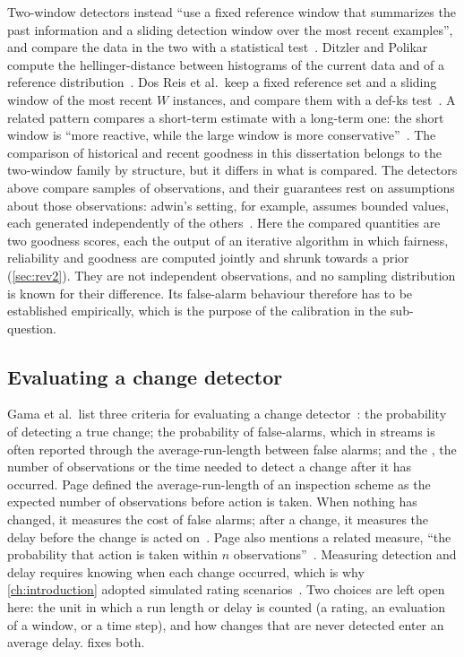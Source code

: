Two-window detectors instead \enquote{use a fixed reference window that summarizes the past information and a sliding detection window over the most recent examples}, and compare the data in the two with a statistical test~\cite[p.~44:17]{Gama2014}. Ditzler and Polikar compute the \gls{hellinger-distance} between histograms of the current data and of a reference distribution~\cite[pp.~42--43]{Ditzler2011}. Dos Reis et al.\ keep a fixed reference set and a sliding window of the most recent $W$ instances, and compare them with a \gls{def-ks} test~\cite[p.~1548]{dosReis2016}. A related pattern compares a short-term estimate with a long-term one: the short window is \enquote{more reactive, while the large window is more conservative}~\cite[p.~44:25]{Gama2014}. The comparison of historical and recent goodness in this dissertation belongs to the two-window family by structure, but it differs in what is compared. The detectors above compare samples of observations, and their guarantees rest on assumptions about those observations: \gls{adwin}'s setting, for example, assumes bounded values, each generated independently of the others~\cite[p.~444]{Bifet2007}. Here the compared quantities are two goodness scores, each the output of an iterative algorithm in which fairness, reliability and goodness are computed jointly and shrunk towards a prior (\cref{sec:rev2}). They are not independent observations, and no sampling distribution is known for their difference. Its false-alarm behaviour therefore has to be established empirically, which is the purpose of the calibration in the sub-question.

\subsection{Evaluating a change detector}\label{sec:evaluating-detector}

Gama et al.\ list three criteria for evaluating a change detector~\cite[p.~44:26]{Gama2014}: the probability of detecting a true change; the probability of \glspl{false-alarm}, which in streams is often reported through the \gls{average-run-length} between false alarms; and the , the number of observations or the time needed to detect a change after it has occurred. Page defined the \gls{average-run-length} of an inspection scheme as the expected number of observations before action is taken. When nothing has changed, it measures the cost of false alarms; after a change, it measures the delay before the change is acted on~\cite[p.~101]{Page1954}. Page also mentions a related measure, \enquote{the probability that action is taken within $n$ observations}~\cite[p.~101]{Page1954}. Measuring detection and delay requires knowing when each change occurred, which is why \cref{ch:introduction} adopted simulated rating scenarios~\cite[p.~44:26]{Gama2014}. Two choices are left open here: the unit in which a run length or delay is counted (a rating, an evaluation of a window, or a time step), and how changes that are never detected enter an average delay.  fixes both.

